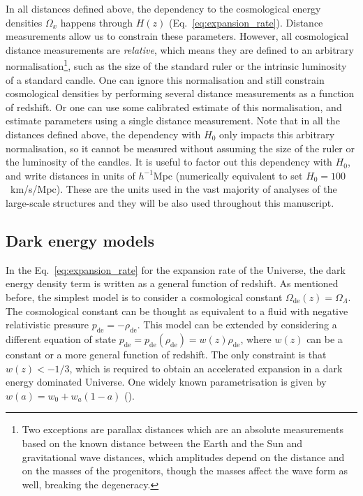     In all distances defined above, the dependency to the cosmological energy densities
    $\Omega_x$ happens through $H(z)$ (Eq.~\ref{eq:expansion_rate}). 
    Distance measurements allow us to constrain these parameters. 
    However, all cosmological distance measurements are \emph{relative}, 
    which means they are defined to an arbitrary 
    normalisation\footnote{Two exceptions are parallax distances which are an absolute measurements
    based on the known distance between the Earth and the Sun and gravitational wave distances,
    which amplitudes depend on the distance and on the masses of the progenitors, though
    the masses affect the wave form as well, breaking the degeneracy.}, 
    such as the size of the standard ruler or the intrinsic luminosity of a standard candle.  
    One can ignore this normalisation and still constrain cosmological densities by 
    performing several distance measurements as a function of redshift.
    Or one can use some calibrated estimate of this normalisation, and estimate parameters 
    using a single distance measurement. 
    Note that in all the distances defined above, the dependency with $H_0$ only impacts
    this arbitrary normalisation, so it cannot be measured without assuming 
    the size of the ruler or the luminosity of the candles. 
    It is useful to factor out this dependency with $H_0$, and write distances 
    in units of $h^{-1}$Mpc (numerically equivalent to set $H_0 = 100$~km/s/Mpc). 
    These are the units used in the vast majority of analyses of the large-scale structures 
    and they will be also used throughout this manuscript. 
    
    \subsection{Dark energy models}
    \label{intro:model:dark_energy_models}

    In the Eq.~\ref{eq:expansion_rate} for the expansion rate of the Universe, 
    the dark energy density term is written as a general function of redshift.
    As mentioned before, the simplest model is to consider a cosmological constant
    $\Omega_{\mathrm{de}}(z) = \Omega_\Lambda$.  
    The cosmological constant can be thought as equivalent to a fluid with 
    negative relativistic pressure $p_\mathrm{de} = -\rho_\mathrm{de}$. 
    This model can be extended by considering a different equation of state 
    $p_\mathrm{de} = p_\mathrm{de}(\rho_\mathrm{de}) = w(z) \rho_\mathrm{de}$, 
    where $w(z)$ can be a constant or a more general function of redshift.
    The only constraint is that $w(z) < -1/3$, which is required to obtain 
    an accelerated expansion in a dark energy dominated Universe. 
    One widely known parametrisation is given by $w(a) = w_0 + w_a(1-a)$ 
    (\cite{chevallierAcceleratingUniversesScaling2001, linderExploringExpansionHistory2003}). 
    
